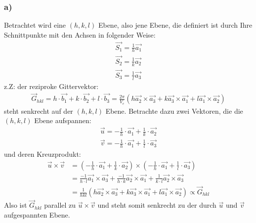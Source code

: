 \documentclass[11pt]{article}
\begin{document}
\subsubsection*{a)}
Betrachtet wird eine $(h,k,l)$ Ebene, also jene Ebene, die definiert ist durch Ihre Schnittpunkte mit den Achsen in folgender Weise:
\begin{align*}
\vec{S_1}=\frac{1}{h}\vec{a_1}\\
\vec{S_2}=\frac{1}{k}\vec{a_2}\\
\vec{S_3}=\frac{1}{l}\vec{a_3}
\end{align*}
z.Z: der reziproke Gittervektor:
\begin{align*}
\vec G_{hkl}=h\cdot\vec{b_1}+k\cdot\vec{b_2}+l\cdot\vec{b_3} = \frac{2\pi}{V_e}(h\vec{a_2}\times\vec{a_3}+k\vec{a_3}\times\vec{a_1}+l\vec{a_1}\times\vec{a_2})
\end{align*}
steht senkrecht auf der $(h,k,l)$ Ebene. Betrachte dazu zwei Vektoren, die die $(h,k,l)$ Ebene aufspannen:
\begin{align*}
\vec{u}= - \frac{1}{h}\cdot\vec{a_1}+\frac{1}{k}\cdot\vec{a_2}\\
\vec{v}= - \frac{1}{h}\cdot\vec{a_1}+\frac{1}{l}\cdot\vec{a_3}
\end{align*}
und deren Kreuzprodukt:
\begin{align*}
\vec{u}\times\vec{v} &= ( -\frac{1}{h}\cdot\vec{a_1}+\frac{1}{k}\cdot\vec{a_2})\times(-\frac{1}{h}\cdot\vec{a_1}+\frac{1}{l}\cdot\vec{a_3})\\
&= \frac{-1}{h\cdot l}\vec{a_1}\times\vec{a_3}+\frac{-1}{h\cdot k}\vec{a_2}\times\vec{a_1}+\frac{1}{k\cdot l}\vec{a_2}\times\vec{a_3}\\
&= \frac{1}{hkl}\left(h\vec{a_2}\times\vec{a_3}+k\vec{a_3}\times\vec{a_1}+l\vec{a_1}\times\vec{a_2}\right)
\propto \vec G_{hkl}
\end{align*}
Also ist $\vec G_{hkl}$ parallel zu $\vec{u}\times\vec{v}$
und steht somit senkrecht zu der durch $\vec u$ und $\vec v$ aufgespannten Ebene.
\end{document}

